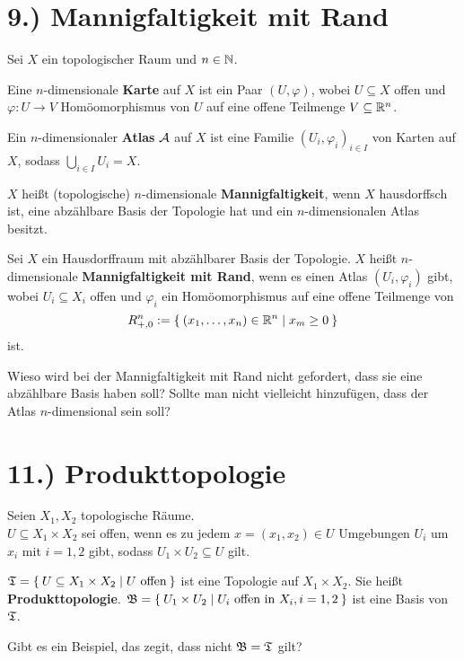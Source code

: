 \documentclass[a5paper,oneside]{scrbook}
\begin{document}
\section*{9.) Mannigfaltigkeit mit Rand}
\begin{definition}%
    Sei $X$ ein topologischer Raum und $n \in \mathbb{N}$.
    \begin{defenum}
        \item Eine $n$-dimensionale \textbf{Karte} auf
              $X$ ist ein Paar $(U, \varphi)$, wobei $U \subseteq X$
              offen und $\varphi: U \rightarrow V$ Homöomorphismus
              von $U$ auf eine offene Teilmenge $V \subseteq \mathbb{R}^n$.
        \item Ein $n$-dimensionaler \textbf{Atlas} $\mathcal{A}$ auf $X$ ist eine
              Familie $(U_i, \varphi_i)_{i \in I}$ von Karten auf $X$,
              sodass $\bigcup_{i \in I} U_i = X$.
        \item $X$ heißt (topologische) $n$-dimensionale \textbf{Mannigfaltigkeit},
              wenn $X$ hausdorffsch ist, eine abzählbare Basis der 
              Topologie hat und ein $n$-dimensionalen Atlas besitzt.
    \end{defenum}
\end{definition}
\begin{definition}%
    Sei $X$ ein Hausdorffraum mit abzählbarer Basis der Topologie.
    $X$ heißt $n$-dimensionale \textbf{Mannigfaltigkeit mit Rand},
    wenn es einen Atlas $(U_i, \varphi_i)$ gibt, wobei $U_i \subseteq X_i$
    offen und $\varphi_i$ ein Homöomorphismus auf eine offene 
    Teilmenge von 
    \[R_{+,0}^n := \Set{(x_1, \dots, x_n) \in \ensuremath{\mathbb{R}}^n | x_m \geq 0}\]
    ist.
\end{definition}

Wieso wird bei der Mannigfaltigkeit mit Rand nicht gefordert, dass
sie eine abzählbare Basis haben soll? Sollte man nicht vielleicht
hinzufügen, dass der Atlas $n$-dimensional sein soll?

\section*{11.) Produkttopologie}
\begin{definition}%
    Seien $X_1, X_2$ topologische Räume.\\
    $U \subseteq X_1 \times X_2$ sei offen, wenn es zu jedem $x = (x_1, x_2) \in U$
    Umgebungen $U_i$ um $x_i$  mit $i=1,2$ gibt, sodass $U_1 \times U_2 \subseteq U$
    gilt.

    $\mathfrak{T} = \Set{U \subseteq X_1 \times X_2 | U \text{ offen}}$
    ist eine Topologie auf $X_1 \times X_2$. Sie heißt \textbf{Produkttopologie}.
    $\mathfrak{B} = \Set{U_1 \times U_2 | U_i \text{ offen in } X_i, i=1,2}$
    ist eine Basis von $\mathfrak{T}$.
\end{definition}
Gibt es ein Beispiel, das zegit, dass nicht $\mathfrak{B} = \mathfrak{T}$ gilt?
\end{document}
